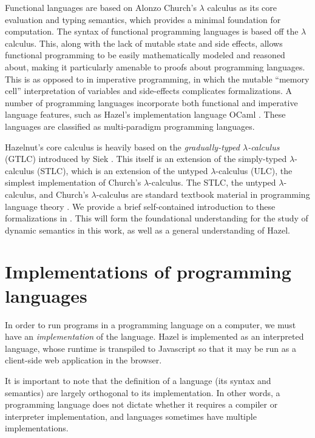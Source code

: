 Functional languages are based on Alonzo Church's $\lambda$ calculus \cite{harper2016practical} as its core evaluation and typing semantics, which provides a minimal foundation for computation. The syntax of functional programming languages is based off the $\lambda$ calculus. This, along with the lack of mutable state and side effects, allows functional programming to be easily mathematically modeled and reasoned about, making it particularly amenable to proofs about programming languages. This is as opposed to in imperative programming, in which the mutable ``memory cell'' interpretation of variables and side-effects complicates formalizations. A number of programming languages incorporate both functional and imperative language features, such as Hazel's implementation language OCaml \cite{hickey2014real}. These languages are classified as multi-paradigm programming languages.

Hazelnut's core calculus is heavily based on the \textit{gradually-typed $\lambda$-calculus} (GTLC) introduced by Siek \cite{Siek06gradualtyping,siek2015refined}. This itself is an extension of the simply-typed $\lambda$-calculus (STLC), which is an extension of the untyped $\lambda$-calculus (ULC), the simplest implementation of Church's $\lambda$-calculus. The STLC, the untyped $\lambda$-calculus, and Church's $\lambda$-calculus are standard textbook material in programming language theory \cite{harper2016practical}. We provide a brief self-contained introduction to these formalizations in . This will form the foundational understanding for the study of dynamic semantics in this work, as well as a general understanding of Hazel.

\section{Implementations of programming languages}
\label{sec:interpreters}

In order to run programs in a programming language on a computer, we must have an \textit{implementation} of the language. Hazel is implemented as an interpreted language, whose runtime is transpiled to Javascript so that it may be run as a client-side web application in the browser.

It is important to note that the definition of a language (its syntax and semantics) are largely orthogonal to its implementation. In other words, a programming language does not dictate whether it requires a compiler or interpreter implementation, and languages sometimes have multiple implementations.

